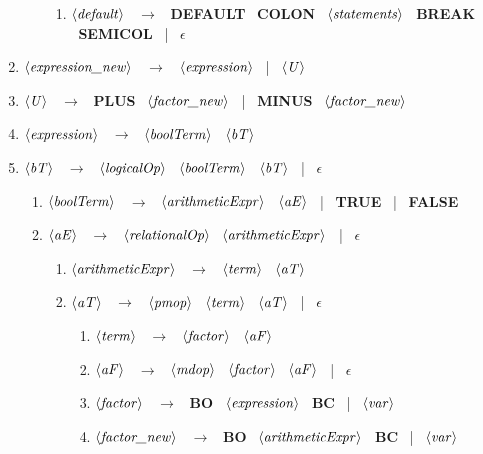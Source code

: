 \documentclass[a4paper]{article}
\newcommand{\nonTerm}[1]{$\left<\text{\textit{#1}}\right>$ \ }
\newcommand{\terminal}[1]{\textbf{\uppercase{#1}} \ }
\newcommand{\ra}[0]{$\rightarrow$ \ }
\newcommand{\eps}[0]{\terminal{$\epsilon$}}
\newcommand{\vertbar}[0]{| \ }
\newcommand{\statements}[0]{\nonTerm{statements}}
\newcommand{\var}[0]{\nonTerm{var}}
\newcommand{\expression}[0]{\nonTerm{expression}}
\newcommand{\expressionNew}[0]{\nonTerm{expression\_new}}
\newcommand{\U}[0]{\nonTerm{U}}
\newcommand{\boolTerm}[0]{\nonTerm{boolTerm}}
\newcommand{\bT}[0]{\nonTerm{bT}}
\newcommand{\arithmeticExpr}[0]{\nonTerm{arithmeticExpr}}
\newcommand{\aE}[0]{\nonTerm{aE}}
\newcommand{\aT}[0]{\nonTerm{aT}}
\newcommand{\aF}[0]{\nonTerm{aF}}
\newcommand{\term}[0]{\nonTerm{term}}
\newcommand{\factor}[0]{\nonTerm{factor}}
\newcommand{\factorNew}[0]{\nonTerm{factor\_new}}
\newcommand{\logicalOp}[0]{\nonTerm{logicalOp}}
\newcommand{\relationalOp}[0]{\nonTerm{relationalOp}}
\newcommand{\pmop}[0]{\nonTerm{pmop}}
\newcommand{\mdop}[0]{\nonTerm{mdop}}
\newcommand{\default}[0]{\nonTerm{default}}
\newcommand{\true}[0]{\terminal{true}}
\newcommand{\false}[0]{\terminal{false}}
\newcommand{\breakTerm}[0]{\terminal{break}}
\newcommand{\defaultTerm}[0]{\terminal{default}}
\newcommand{\plus}[0]{\terminal{plus}}
\newcommand{\minus}[0]{\terminal{minus}}
\newcommand{\colonTerm}[0]{\terminal{colon}}
\newcommand{\semicol}[0]{\terminal{semicol}}
\newcommand{\bo}[0]{\terminal{bo}}
\newcommand{\bc}[0]{\terminal{bc}}
\begin{document}
\begin{enumerate}
\begin{enumerate}
\begin{enumerate}
            \item \default \ra \defaultTerm \colonTerm \statements \breakTerm \semicol \vertbar \eps
        \end{enumerate}
    \end{enumerate}
    
    \item \expressionNew \ra \expression \vertbar \U
    \item \U \ra \plus \factorNew \vertbar \minus \factorNew
    
    \item \expression \ra \boolTerm \bT
    \item \bT \ra \logicalOp \boolTerm \bT \vertbar \eps
    
    \begin{enumerate}
        \item \boolTerm \ra \arithmeticExpr \aE \vertbar \true \vertbar \false
        \item \aE \ra \relationalOp \arithmeticExpr \vertbar \eps
        
        \begin{enumerate}
            \item \arithmeticExpr \ra \term \aT
            \item \aT \ra \pmop \term \aT \vertbar \eps
    
            \begin{enumerate}
                \item \term \ra \factor \aF
                \item \aF \ra \mdop \factor \aF \vertbar \eps
                
                \item \factor \ra \bo \expression \bc \vertbar \var
                \item \factorNew \ra \bo \arithmeticExpr \bc \vertbar \var
            \end{enumerate}
        \end{enumerate}
    \end{enumerate}
    

\end{enumerate}
\end{document}
